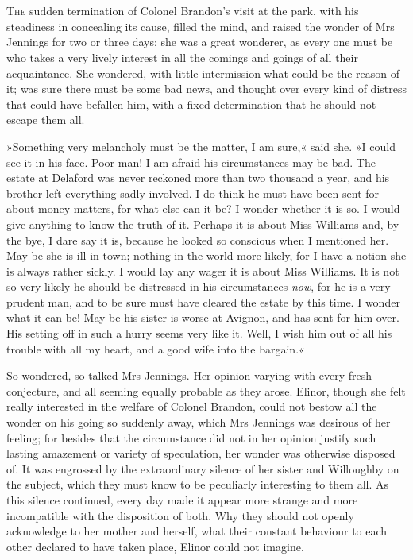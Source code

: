 \chapter[Chapter \thechapter]{}
\lettrine[lines=4,lraise=0.3]{T}{he} sudden termination of Colonel Brandon’s visit at the park, with his steadiness in concealing its cause, filled the mind, and raised the wonder of Mrs Jennings for two or three days; she was a great wonderer, as every one must be who takes a very lively interest in all the comings and goings of all their acquaintance. She wondered, with little intermission what could be the reason of it; was sure there must be some bad news, and thought over every kind of distress that could have befallen him, with a fixed determination that he should not escape them all.

»Something very melancholy must be the matter, I am sure,« said she. »I could see it in his face. Poor man! I am afraid his circumstances may be bad. The estate at Delaford was never reckoned more than two thousand a year, and his brother left everything sadly involved. I do think he must have been sent for about money matters, for what else can it be? I wonder whether it is so. I would give anything to know the truth of it. Perhaps it is about Miss Williams and, by the bye, I dare say it is, because he looked so conscious when I mentioned her. May be she is ill in town; nothing in the world more likely, for I have a notion she is always rather sickly. I would lay any wager it is about Miss Williams. It is not so very likely he should be distressed in his circumstances \textit{now}, for he is a very prudent man, and to be sure must have cleared the estate by this time. I wonder what it can be! May be his sister is worse at Avignon, and has sent for him over. His setting off in such a hurry seems very like it. Well, I wish him out of all his trouble with all my heart, and a good wife into the bargain.«

So wondered, so talked Mrs Jennings. Her opinion varying with every fresh conjecture, and all seeming equally probable as they arose. Elinor, though she felt really interested in the welfare of Colonel Brandon, could not bestow all the wonder on his going so suddenly away, which Mrs Jennings was desirous of her feeling; for besides that the circumstance did not in her opinion justify such lasting amazement or variety of speculation, her wonder was otherwise disposed of. It was engrossed by the extraordinary silence of her sister and Willoughby on the subject, which they must know to be peculiarly interesting to them all. As this silence continued, every day made it appear more strange and more incompatible with the disposition of both. Why they should not openly acknowledge to her mother and herself, what their constant behaviour to each other declared to have taken place, Elinor could not imagine.

